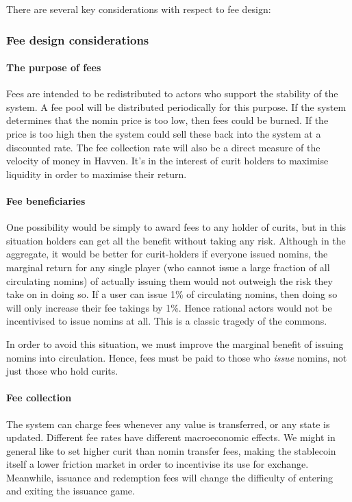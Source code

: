 There are several key considerations with respect to fee design:

\subsubsection{Fee design considerations}

\paragraph{The purpose of fees}

Fees are intended to be redistributed to actors who support the stability of the system. A fee pool will be distributed periodically for this purpose.
If the system determines that the nomin price is too low, then fees could be burned. If the price is too high then the system could sell these back
into the system at a discounted rate. The fee collection rate will also be a direct measure of the velocity of money in Havven. It's in the interest
of curit holders to maximise liquidity in order to maximise their return.

\paragraph{Fee beneficiaries}

One possibility would be simply to award fees to any holder of curits,
but in this situation holders can get all the benefit without taking any risk.
Although in the aggregate, it would be better for curit-holders if everyone issued nomins,
the marginal return for any single player (who cannot issue a large fraction of all circulating nomins)
of actually issuing them would not outweigh the risk they take on in doing so. If a user can issue 1\% of circulating
nomins, then doing so will only increase their fee takings by 1\%. Hence rational actors would not be incentivised to issue nomins at all.
This is a classic tragedy of the commons.

\noindent In order to avoid this situation, we must improve the marginal benefit of issuing nomins into circulation.
Hence, fees must be paid to those who \textit{issue} nomins, not just those who hold curits.

\paragraph{Fee collection}

The system can charge fees whenever any value is transferred, or any state is updated.
\noindent Different fee rates have different macroeconomic effects. We might in general like to set higher curit than nomin transfer fees, making the stablecoin itself a lower friction market in order to incentivise its use for exchange. Meanwhile, issuance and redemption fees will change the difficulty of entering and exiting the issuance game. \\

